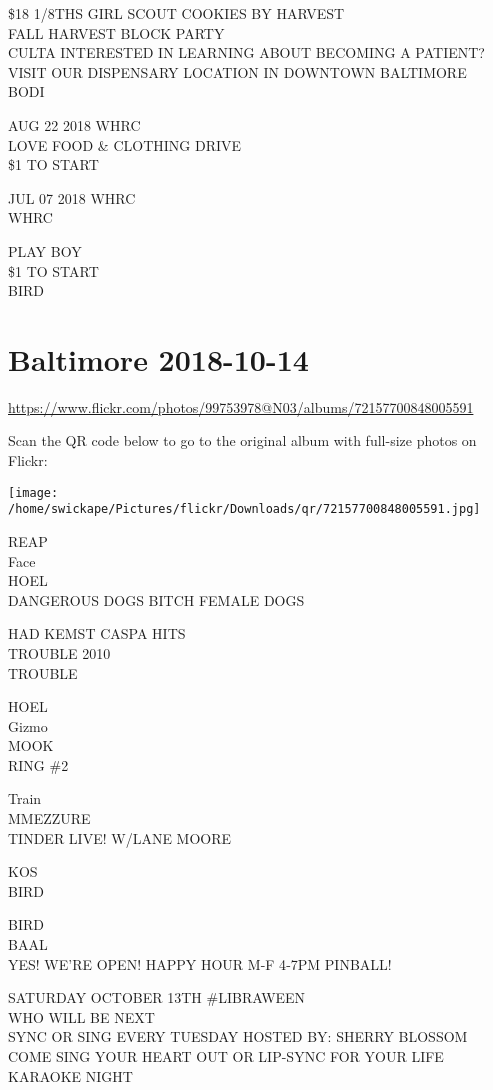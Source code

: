 \documentclass[10pt,letterpaper]{article}
\begin{document}
\$18 1/8THS GIRL SCOUT COOKIES BY HARVEST\\
FALL HARVEST BLOCK PARTY\\
CULTA INTERESTED IN LEARNING ABOUT BECOMING A PATIENT?  VISIT OUR DISPENSARY LOCATION IN DOWNTOWN BALTIMORE\\
BODI

AUG 22 2018 WHRC\\
LOVE FOOD \& CLOTHING DRIVE\\
\$1 TO START

JUL 07 2018 WHRC\\
WHRC

PLAY BOY\\
\$1 TO START\\
BIRD
\pagebreak

\section*{Baltimore 2018-10-14}

\url{https://www.flickr.com/photos/99753978@N03/albums/72157700848005591}

Scan the QR code below to go to the original album with full-size photos on Flickr:

\texttt{[image: /home/swickape/Pictures/flickr/Downloads/qr/72157700848005591.jpg]}
\pagebreak

REAP\\
Face\\
HOEL\\
DANGEROUS DOGS BITCH FEMALE DOGS

HAD KEMST CASPA HITS\\
TROUBLE 2010\\
TROUBLE

HOEL\\
Gizmo\\
MOOK\\
RING \#2

Train\\
MMEZZURE\\
TINDER LIVE! W/LANE MOORE

KOS\\
BIRD

BIRD\\
BAAL\\
YES!  WE'RE OPEN!  HAPPY HOUR M{-}F 4{-}7PM PINBALL!

SATURDAY OCTOBER 13TH \#LIBRAWEEN\\
WHO WILL BE NEXT\\
SYNC OR SING EVERY TUESDAY HOSTED BY: SHERRY BLOSSOM COME SING YOUR HEART OUT OR LIP{-}SYNC FOR YOUR LIFE\\
KARAOKE NIGHT
\end{document}
